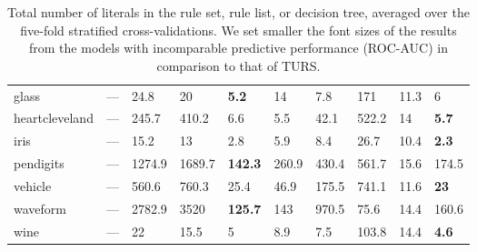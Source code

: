 \begin{table}[ht]
\begin{tabular}{l|llllllll|l}
  glass & --- & 24.8 & 20 & \textbf{5.2} & 14 & 7.8 & 171 & \tiny{11.3} & 6 \\ 
  heartcleveland & --- & 245.7 & \tiny{410.2} & 6.6 & \tiny{5.5} & 42.1 & 522.2 & \tiny{14} & \textbf{5.7} \\ 
  iris & --- & 15.2 & 13 & 2.8 & 5.9 & 8.4 & 26.7 & \tiny{10.4} & \textbf{2.3} \\ 
  pendigits & --- & 1274.9 & 1689.7 & \textbf{142.3} & 260.9 & 430.4 & 561.7 & \tiny{15.6} & 174.5 \\ 
  vehicle & --- & 560.6 & 760.3 & 25.4 & 46.9 & 175.5 & \tiny{741.1} & \tiny{11.6} & \textbf{23} \\ 
  waveform & --- & 2782.9 & \tiny{3520} & \textbf{125.7} & 143 & \tiny{970.5} & \tiny{75.6} & \tiny{14.4} & 160.6 \\ 
  wine & --- & 22 & 15.5 & 5 & 8.9 & 7.5 & 103.8 & 14.4 & \textbf{4.6} \\ 
   \hline
\end{tabular}
\caption{Total number of literals in the rule set, rule list, or decision tree, averaged over the five-fold stratified cross-validations. We set smaller the font sizes of the results from the models with incomparable predictive performance (ROC-AUC) in comparison to that of TURS. }
\label{table:num_literal}
\end{table}